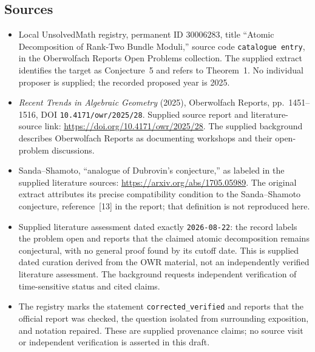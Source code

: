\documentclass[11pt]{article}
\begin{document}
\subsection{Sources}
\begin{itemize}
\item Local UnsolvedMath registry, permanent ID \(30006283\), title ``Atomic Decomposition of Rank-Two Bundle Moduli,'' source code \texttt{catalogue entry}, in the Oberwolfach Reports Open Problems collection. The supplied extract identifies the target as Conjecture~5 and refers to Theorem~1. No individual proposer is supplied; the recorded proposed year is 2025.
\item \emph{Recent Trends in Algebraic Geometry} (2025), Oberwolfach Reports, pp.~1451--1516, DOI \texttt{10.4171/owr/2025/28}. Supplied source report and literature-source link: \url{https://doi.org/10.4171/owr/2025/28}. The supplied background describes Oberwolfach Reports as documenting workshops and their open-problem discussions.
\item Sanda--Shamoto, ``analogue of Dubrovin's conjecture,'' as labeled in the supplied literature sources: \url{https://arxiv.org/abs/1705.05989}. The original extract attributes its precise compatibility condition to the Sanda--Shamoto conjecture, reference~[13] in the report; that definition is not reproduced here.
\item Supplied literature assessment dated exactly \texttt{2026-08-22}: the record labels the problem open and reports that the claimed atomic decomposition remains conjectural, with no general proof found by its cutoff date. This is supplied dated curation derived from the OWR material, not an independently verified literature assessment. The background requests independent verification of time-sensitive status and cited claims.
\item The registry marks the statement \texttt{corrected\_verified} and reports that the official report was checked, the question isolated from surrounding exposition, and notation repaired. These are supplied provenance claims; no source visit or independent verification is asserted in this draft.
\end{itemize}
\end{document}
